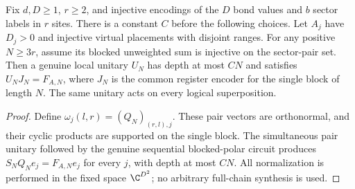 \begin{lemma}
    \label{thm:ldp_exact_whole_encoder_circuit}
    \leanok
    Fix $d,D\ge1$, $r\ge2$, and injective encodings of the $D$ bond
    values and $b$ sector labels in $r$ sites. There is a constant $C$
    before the following choices. Let $A_j$ have $D_j>0$ and injective
    virtual placements with disjoint ranges. For any positive
    $N\ge3r$, assume its blocked unweighted sum is injective on the
    sector-pair set. Then a genuine local unitary $U_N$ has depth
    at most $CN$ and satisfies $U_NJ_N=F_{A,N}$, where $J_N$ is the
    common register encoder for the single block of length $N$.
    The same unitary acts on every logical superposition.
\end{lemma}
\begin{proof}\leanok
    Define $\omega_j(l,r)=(Q_N)_{(r,l),j}$. These pair vectors are
    orthonormal, and their cyclic products are supported on the
    single block. The simultaneous pair unitary followed by the genuine
    sequential blocked-polar circuit produces $S_NQ_Ne_j=F_{A,N}e_j$
    for every $j$, with depth at most $CN$. All normalization is performed
    in the fixed space $\C^{D^2}$; no arbitrary full-chain synthesis is used.
\end{proof}
